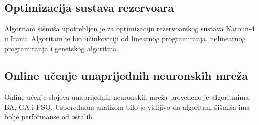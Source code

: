 \subsection{Optimizacija sustava rezervoara}
\hspace{\parindent} Algoritam šišmiša upotrebljen je za optimizaciju rezervoarskog sustava Karoun-4 u Iranu.\cite{doi:10.1061/(ASCE)WR.1943-5452.0000498} Algoritam je bio učinkovitiji od linearnog programiranja, nelinearnog programiranja i genetskog algoritma. 

\subsection{Online učenje unaprijednih neuronskih mreža}
\hspace{\parindent} Online učenje slojeva unaprijednih neuronskih mreža provedeno je algoritmima: BA, GA i PSO.\cite{khankoffka2012} Usporednom analizom bilo je vidljivo da algoritam šišmiša ima bolje performanse od ostalih.